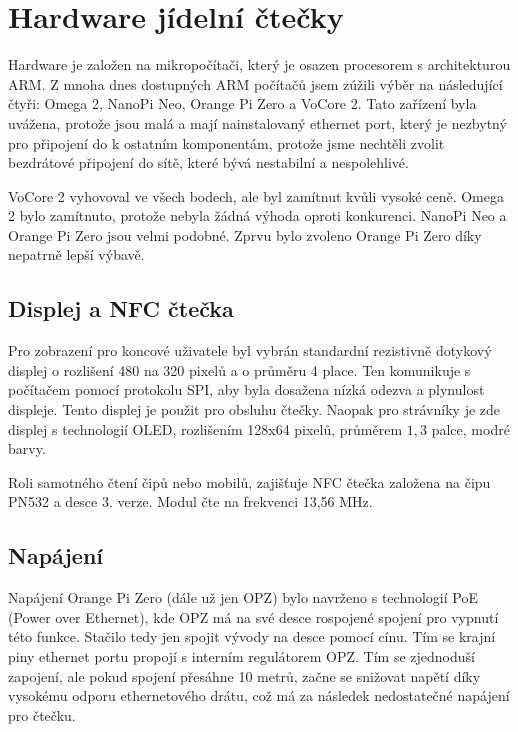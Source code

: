 \chapter{Hardware jídelní čtečky}

Hardware je založen na mikropočítači, který je osazen procesorem s architekturou ARM.
Z mnoha dnes dostupných ARM počítačů jsem zúžili výběr na následující čtyři:
Omega 2, NanoPi Neo, Orange Pi Zero a VoCore 2.
Tato zařízení byla uvážena, protože jsou malá a mají nainstalovaný ethernet port,
který je nezbytný pro připojení do k ostatním komponentám,
protože jsme nechtěli zvolit bezdrátové připojení do sítě,
které bývá nestabilní a nespolehlivé.

VoCore 2 vyhovoval ve všech bodech, ale byl zamítnut kvůli vysoké ceně.
Omega 2 bylo zamítnuto, protože nebyla žádná výhoda oproti konkurenci.
NanoPi Neo a Orange Pi Zero jsou velmi podobné.
Zprvu bylo zvoleno Orange Pi Zero díky nepatrně lepší výbavě.

\section{Displej a NFC čtečka}

Pro zobrazení pro koncové uživatele byl vybrán standardní rezistivně dotykový displej o
rozlišení 480 na 320 pixelů a o průměru 4 place. Ten komunikuje s počítačem pomocí protokolu SPI,
aby byla dosažena nízká odezva a plynulost displeje. Tento displej je použit pro obsluhu čtečky.
Naopak pro strávníky je zde displej s technologií OLED, rozlišením 128x64 pixelů,
průměrem $1,3$ palce, modré barvy.

Roli samotného čtení čipů nebo mobilů, zajišťuje NFC čtečka založena na
čipu PN532 a desce 3. verze. Modul čte na frekvenci 13,56 MHz.

\section{Napájení}

Napájení Orange Pi Zero (dále už jen OPZ) bylo navrženo s technologií PoE (Power over Ethernet),
kde OPZ má na své desce rospojené spojení pro vypnutí této funkce.
Stačilo tedy jen spojit vývody na desce pomocí cínu.
Tím se krajní piny ethernet portu propojí s interním regulátorem OPZ.
Tím se zjednoduší zapojení, ale pokud spojení přesáhne 10 metrů,
začne se snižovat napětí díky vysokému odporu ethernetového drátu,
což má za následek nedostatečné napájení pro čtečku.

